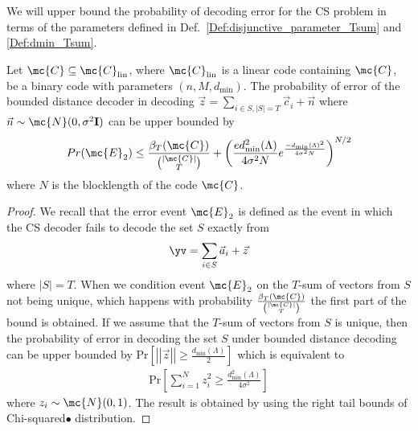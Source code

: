 \documentclass[final,onecolumn,12pt]{IEEEtran}
\def\dmin{d_{\mathrm{min}}}
\def\Pr{\mathrm{Pr}}
\begin{document}
We will upper bound the probability of decoding error for the CS problem in terms of the parameters defined in Def.~\ref{Def:disjunctive_parameter_Tsum} and \ref{Def:dmin_Tsum}.
\begin{lemma}
Let $\mc{C}\subseteq \mc{C}_{\text{lin}}$, where $\mc{C}_{\text{lin}}$ is a linear code containing $\mc{C}$, be a binary code with parameters $(n,M,\dmin)$. The probability of error of the bounded distance decoder in decoding $\vec{z}=\sum_{i\in S,|S|= T}\vec{c}_i+\vec{n}$ where $\vec{n}\sim \mc{N}(0,\sigma^2 \mathbf{I})$ can be upper bounded by
\[
Pr(\mc{E}_2)\leq \frac{\beta_T(\mc{C})}{\binom{|\mc{C}|}{T}}+ \left(\frac{e\dmin^2(\Lambda)}{4\sigma^2 N}e^{\frac{-\dmin(\Lambda)^2}{4\sigma^2 N}}\right)^{N/2}
\]
where $N$ is the blocklength of the code $\mc{C}$.
\label{Lem:CS_UpperBound}
\end{lemma}
\begin{proof}
We recall that the error event $\mc{E}_2$ is defined as the event in which the CS decoder fails to decode the set $S$ exactly from
\[
\yv=\sum_{i\in S}\vec{a}_i+\vec{z}
\]
where $|S|=T$. When we condition event $\mc{E}_2$ on the $T$-sum of vectors from $S$ not being unique, which happens with probability $\frac{\beta_T(\mc{C})}{\binom{|\mc{C}|}{T}}$ the first part of the bound is obtained. If we assume that the $T$-sum of vectors from $S$ is unique, then the probability of error in decoding the set $S$ under bounded distance decoding can be upper bounded by  $\Pr \left[\left|\left|\vec{z}\right|\right|\geq \frac{\dmin(\Lambda)}{2}\right]$ which is equivalent to
\begin{align*}
 \Pr\left[ \sum_{i=1}^{N}z^2_i \geq \frac{\dmin^2(\Lambda)}{4\sigma^2}\right]
\end{align*}
where $z_i\sim \mc{N}(0,1)$. The result is obtained by using the right tail bounds of Chi-squared$•$ distribution.
\end{proof}
\end{document}
